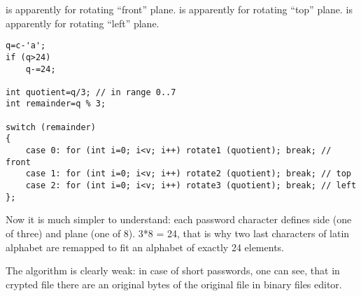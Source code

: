 { is apparently for rotating ``front'' plane. 
 is apparently for rotating ``top'' plane. 
 is apparently for rotating ``left'' plane.}


\begin{lstlisting}
q=c-'a';
if (q>24)
	q-=24;

int quotient=q/3; // in range 0..7
int remainder=q % 3;

switch (remainder)
{
    case 0: for (int i=0; i<v; i++) rotate1 (quotient); break; // front
    case 1: for (int i=0; i<v; i++) rotate2 (quotient); break; // top
    case 2: for (int i=0; i<v; i++) rotate3 (quotient); break; // left
};
\end{lstlisting}

{Now it is much simpler to understand: each password character defines side (one of three) and plane (one of 8). 
3*8 = 24, that is why two last characters of latin alphabet are remapped to fit an alphabet of exactly 
24 elements.}

{The algorithm is clearly weak: in case of short passwords, one can see,
that in crypted file there are 
an original bytes of the original file in binary files editor.}





